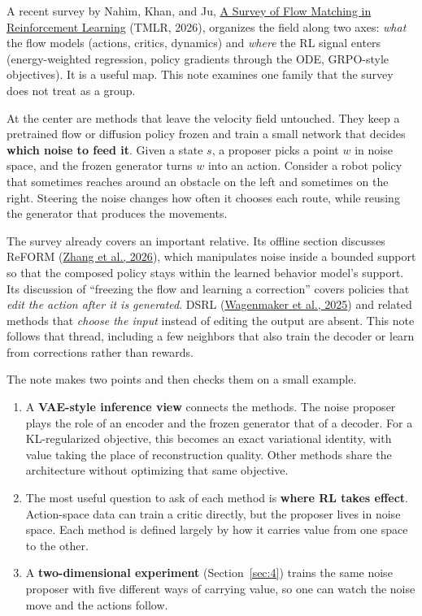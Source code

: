 A recent survey by Nahim, Khan, and Ju, \hyperlink{ref:1}{A Survey of Flow Matching in Reinforcement Learning} (TMLR, 2026), organizes the field along two axes: \emph{what} the flow models (actions, critics, dynamics) and \emph{where} the RL signal enters (energy-weighted regression, policy gradients through the ODE, GRPO-style objectives). It is a useful map. This note examines one family that the survey does not treat as a group.

At the center are methods that leave the velocity field untouched. They keep a pretrained flow or diffusion policy frozen and train a small network that decides \textbf{which noise to feed it}. Given a state $s$, a proposer picks a point $w$ in noise space, and the frozen generator turns $w$ into an action. Consider a robot policy that sometimes reaches around an obstacle on the left and sometimes on the right. Steering the noise changes how often it chooses each route, while reusing the generator that produces the movements.

The survey already covers an important relative. Its offline section discusses ReFORM (\hyperlink{ref:13}{Zhang et al., 2026}), which manipulates noise inside a bounded support so that the composed policy stays within the learned behavior model's support. Its discussion of ``freezing the flow and learning a correction'' covers policies that \emph{edit the action after it is generated}. DSRL (\hyperlink{ref:2}{Wagenmaker et al., 2025}) and related methods that \emph{choose the input} instead of editing the output are absent. This note follows that thread, including a few neighbors that also train the decoder or learn from corrections rather than rewards.

The note makes two points and then checks them on a small example.

\begin{enumerate}
\item A \textbf{VAE-style inference view} connects the methods. The noise proposer plays the role of an encoder and the frozen generator that of a decoder. For a KL-regularized objective, this becomes an exact variational identity, with value taking the place of reconstruction quality. Other methods share the architecture without optimizing that same objective.
\item The most useful question to ask of each method is \textbf{where RL takes effect}. Action-space data can train a critic directly, but the proposer lives in noise space. Each method is defined largely by how it carries value from one space to the other.
\item A \textbf{two-dimensional experiment} (Section~\ref{sec:4}) trains the same noise proposer with five different ways of carrying value, so one can watch the noise move and the actions follow.
\end{enumerate}

